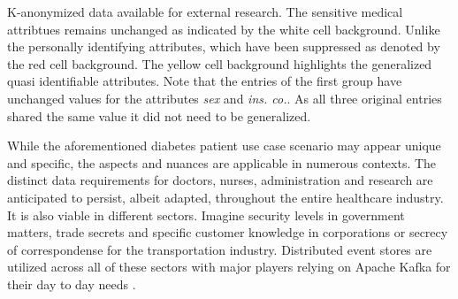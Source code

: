 \begin{table}[ht]
\begin{center}
{\begin{adjustbox}{center}
            \end{adjustbox}
        }
    \caption{K-anonymized data available for external research. The sensitive medical attribtues remains unchanged as indicated by the white cell background. Unlike the personally identifying attributes, which have been suppressed as denoted by the red cell background. The yellow cell background highlights the generalized quasi identifiable attributes. Note that the entries of the first group have unchanged values for the attributes \textit{sex} and \textit{ins. co.}. As all three original entries shared the same value it did not need to be generalized.}
    \label{table:k_anon}
    \end{center}
\end{table}

While the aforementioned diabetes patient use case scenario may appear unique and specific, the aspects and nuances are applicable in numerous contexts. The distinct data requirements for doctors, nurses, administration and research are anticipated to persist, albeit adapted, throughout the entire healthcare industry. 
It is also viable in different sectors. Imagine security levels in government matters, trade secrets and specific customer knowledge in corporations or secrecy of correspondense for the transportation industry. Distributed event stores are utilized across all of these sectors with major players relying on Apache Kafka for their day to day needs \cite{KafkaPoweredBY}. 

